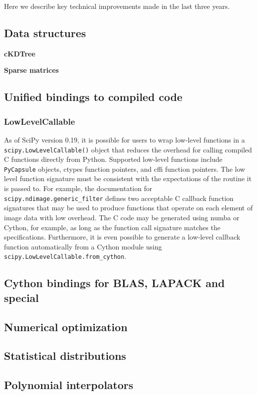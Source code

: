 \documentclass[fleqn,10pt]{wlscirep}
\begin{document}
Here we describe key technical improvements made in the last three years.

\subsection*{Data structures}
\textbf{cKDTree}

\textbf{Sparse matrices}

\subsection*{Unified bindings to compiled code}
\subsubsection*{LowLevelCallable}
As of SciPy version 0.19, it is possible for users to wrap low-level
functions in a \texttt{scipy.LowLevelCallable()} object that reduces
the overhead for calling compiled C functions directly from Python.
Supported low-level functions include \texttt{PyCapsule} objects,
ctypes function pointers, and cffi function pointers. The low level
function signature must be consistent with the expectations of the
routine it is passed to. For example, the documentation for
\texttt{scipy.ndimage.generic\_filter} defines two acceptable C callback
function signatures that may be used to produce functions that operate
on each element of image data with low overhead. The C code may be
generated using numba or Cython, for example, as long as the function
call signature matches the specifications. Furthermore, it is even
possible to generate a low-level callback function automatically
from a Cython module using \texttt{scipy.LowLevelCallable.from\_cython}.

\subsection*{Cython bindings for BLAS, LAPACK and special}

\subsection*{Numerical optimization}



\subsection*{Statistical distributions}

\subsection*{Polynomial interpolators}

\end{document}

